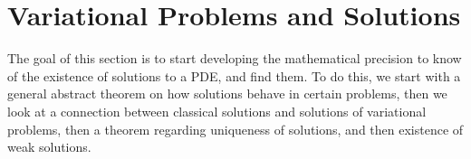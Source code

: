 \section{Variational Problems and Solutions}
The goal of this section is to start developing the mathematical 
precision to know of the existence of solutions to a PDE, and find 
them. 
To do this, we start with a general abstract theorem on how solutions 
behave in certain problems, then we look at a connection between 
classical solutions and solutions of variational problems, then a 
theorem regarding uniqueness of solutions, and then existence of 
weak solutions.






